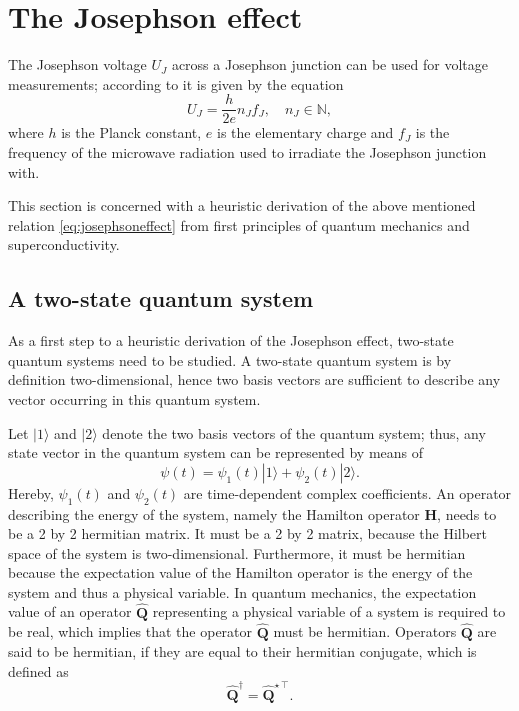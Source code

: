 \documentclass{report}
\numberwithin{tm}{section}
\newcommand\matr[1]{\ensuremath{\boldsymbol{\mathbf{#1}}}}
\begin{document}

	
\section{The Josephson effect}
	The Josephson voltage $U_J$ across a Josephson junction can be used for voltage measurements; according to \cite{Kajastie_2009} it is given by the equation \begin{equation}\label{eq:josephsoneffect}
		U_J = \frac{h}{2e}n_Jf_J, \quad n_J \in \mathbb{N},
	\end{equation} where $h$ is the Planck constant, $e$ is the elementary charge and $f_J$ is the frequency of the microwave radiation used to irradiate the Josephson junction with.
	
	This section is concerned with a heuristic derivation of the above mentioned relation \cref{eq:josephsoneffect} from first principles of quantum mechanics and superconductivity.

\subsection{A two-state quantum system}
As a first step to a heuristic derivation of the Josephson effect, two-state quantum systems need to be studied. A two-state quantum system is by definition two-dimensional, hence two basis vectors are sufficient to describe any vector occurring in this quantum system. 

Let $|1\rangle$ and $|2\rangle$ denote the two basis vectors of the quantum system; thus, any state vector in the quantum system can be represented by means of \begin{equation}
	\psi(t) = \psi_1(t)|1\rangle + \psi_2(t)|2\rangle.
\end{equation} Hereby, $\psi_1(t)$ and $\psi_2(t)$ are time-dependent complex coefficients. An operator describing the energy of the system, namely the Hamilton operator $\matr{H}$, needs to be a 2 by 2 hermitian matrix. It must be a 2 by 2 matrix, because the Hilbert space of the system is two-dimensional. Furthermore, it must be hermitian because the expectation value of the Hamilton operator is the energy of the system and thus a physical variable. In quantum mechanics, the expectation value of an operator $\hat{\matr{Q}}$ representing a physical variable of a system is required to be real, which implies that the operator $\hat{\matr{Q}}$ must be hermitian. Operators $\hat{\matr{Q}}$ are said to be hermitian, if they are equal to their hermitian conjugate, which is defined as \begin{equation}
\hat{\matr{Q}}^\dagger = \hat{\matr{Q}}^{\star\,\top}.
\end{equation}
\end{document}
